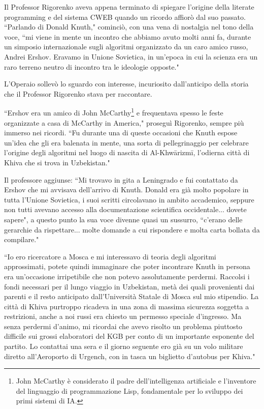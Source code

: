 \documentclass[12pt,b5paper]{article}
\begin{document}
Il Professor Rigorenko aveva appena terminato di spiegare l'origine della
literate programming e del sistema CWEB quando un ricordo affiorò dal suo
passato. ``Parlando di Donald Knuth," cominciò, con una vena di nostalgia nel
tono della voce, ``mi viene in mente un incontro che abbiamo avuto molti anni fa,
durante un simposio internazionale sugli algoritmi organizzato da un caro amico
russo, Andrei Ershov. Eravamo in Unione Sovietica, in un'epoca in cui la scienza
era un raro terreno neutro di incontro tra le ideologie opposte."

L'Operaio sollevò lo sguardo con interesse, incuriosito dall'anticipo della
storia che il Professor Rigorenko stava per raccontare.

``Ershov era un amico di John McCarthy\footnote{John McCarthy è considerato il padre dell'intelligenza artificiale e l'inventore del linguaggio di programmazione Lisp, fondamentale per lo sviluppo dei primi sistemi di IA.} e frequentava spesso le feste organizzate
a casa di McCarthy in America," proseguì Rigorenko, sempre più immerso nei ricordi.
``Fu durante una di queste occasioni che Knuth espose un'idea che gli era
balenata in mente, una sorta di pellegrinaggio per celebrare l'origine degli
algoritmi nel luogo di nascita di Al-Khwārizmī, l'odierna città di Khiva che
si trova in Uzbekistan."

Il professore aggiunse: ``Mi trovavo in gita a Leningrado e fui contattato da
Ershov che mi avvisava dell'arrivo di Knuth. Donald era già molto popolare in
tutta l'Unione Sovietica, i suoi scritti circolavano in ambito accademico, seppure
non tutti avevano accesso alla documentazione scientifica occidentale... dovete
sapere", a questo punto la sua voce divenne quasi un sussurro,  ``c'erano
delle gerarchie da rispettare... molte domande a cui rispondere e molta carta
bollata da compilare."

``Io ero ricercatore a Mosca e mi interessavo di teoria degli algoritmi
approssimati, potete quindi immaginare che poter incontrare Knuth in persona
era un'occasione irripetibile che non potevo assolutamente perdermi.
Raccolsi i fondi necessari per il lungo viaggio in Uzbekistan, metà dei quali
provenienti dai parenti e il resto anticipato dall'Università Statale di Mosca
sul mio stipendio. La città di Khiva purtroppo ricadeva in una zona di massima
sicurezza soggetta a restrizioni, anche a noi russi era chiesto un permesso
speciale d'ingresso. Ma senza perdermi d'animo, mi ricordai che avevo risolto
un problema piuttosto difficile sui grossi elaboratori del KGB per conto di
un importante esponente del partito. Lo contattai una sera e il giorno seguente
ero già su un volo militare diretto all'Aeroporto di Urgench, con in tasca un
biglietto d'autobus per Khiva."
\end{document}
